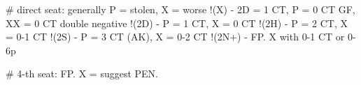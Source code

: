 # direct seat: generally P = stolen, X = worse
!(X) - 2D = 1 CT, P = 0 CT GF, XX = 0 CT double negative
!(2D) - P = 1 CT, X = 0 CT
!(2H) - P = 2 CT, X = 0-1 CT
!(2S) - P = 3 CT (AK), X = 0-2 CT
!(2N+) - FP. X with 0-1 CT or 0-6p

# 4-th seat:
FP. X = suggest PEN.